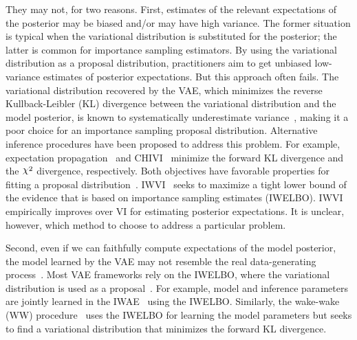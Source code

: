 They may not, for two reasons.
First, estimates of the relevant expectations of the posterior may be biased and/or may have high variance. The former situation is typical when the variational distribution is substituted for the posterior; the latter is common for importance sampling estimators. By using the variational distribution as a proposal distribution, practitioners aim to get unbiased low-variance estimates of posterior expectations. But this approach often fails. The variational distribution recovered by the VAE, which minimizes the reverse Kullback-Leibler (KL) divergence between the variational distribution and the model posterior, is known to systematically underestimate variance~\cite{wainwright2008graphical,Turner2011}, making it a poor choice for an importance sampling proposal distribution. Alternative inference procedures have been proposed to address this problem. For example, expectation propagation~\cite{minka2013expectation} and CHIVI~\cite{NIPS2017_6866} minimize the forward KL divergence and the $\rchi^2$ divergence, respectively. Both objectives have favorable properties for fitting a proposal distribution~\cite{Chatterjee2018,Agapiou2017}. IWVI~\cite{NIPS2018_7699} seeks to maximize a tight lower bound of the evidence that is based on importance sampling estimates (IWELBO). IWVI empirically improves over VI for estimating posterior expectations. It is unclear, however, which method to choose to address a particular problem.

Second, even if we can faithfully compute expectations of the model posterior, the model learned by the VAE may not resemble the real data-generating process~\cite{Turner2011}. Most VAE frameworks rely on the IWELBO, where the variational distribution is used as a proposal~\cite{BurdaGS15,rainforth2018tighter,chen2018variational}. For example, model and inference parameters are jointly learned in the IWAE~\cite{BurdaGS15} using the IWELBO. Similarly, the wake-wake (WW) procedure~\cite{Bornschein2015,le2018revisiting} uses the IWELBO for learning the model parameters but seeks to find a variational distribution that minimizes the forward KL divergence. 

